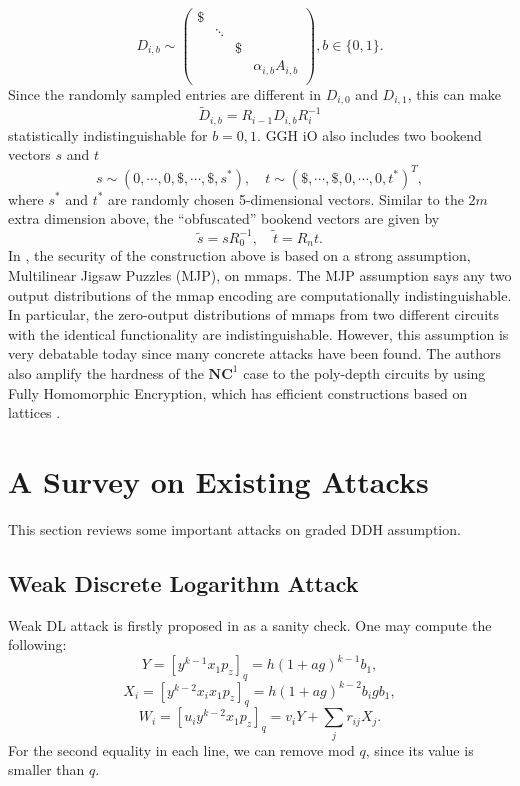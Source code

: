 \documentclass[10pt]{article}
\theoremstyle{plain}
\theoremstyle{definition}
\theoremstyle{remark}
\newcommand{\bits}{\{0,1\}}
\begin{document}
$$D_{i,b} \sim \begin{pmatrix}
\$ & & & \\
& \ddots & & \\
& & \$ & \\
& & & \alpha_{i,b} A_{i,b} \\
\end{pmatrix}, b \in \bits.$$ 
Since the randomly sampled entries are different in $D_{i,0}$ and $D_{i,1}$, this can make 
$$\tilde{D}_{i,b} = R_{i-1} D_{i,b} R_i^{-1}$$
statistically indistinguishable for $b = 0,1$. GGH iO also includes two bookend vectors $s$ and $t$
$$s \sim (0, \cdots, 0, \$, \cdots, \$, s^*), \quad t \sim (\$, \cdots, \$, 0, \cdots, 0, t^*)^T,$$
where $s^*$ and $t^*$ are randomly chosen 5-dimensional vectors. Similar to the $2m$ extra dimension above, the ``obfuscated'' bookend vectors are given by
$$\tilde{s} = sR_0^{-1}, \quad \tilde{t} = R_n t.$$
In \cite{GGH13b}, the security of the construction above is based on a strong assumption, Multilinear Jigsaw Puzzles (MJP), on mmaps. The MJP assumption says any two output distributions of the mmap encoding are computationally indistinguishable. In particular, the zero-output distributions of mmaps from two different circuits with the identical functionality are indistinguishable. However, this assumption is very debatable today since many concrete attacks have been found. The authors also amplify the hardness of the $\mathbf{NC}^1$ case to the poly-depth circuits by using Fully Homomorphic Encryption, which has efficient constructions based on lattices \cite{BV14, GSW13}.

\section{A Survey on Existing Attacks}
This section reviews some important attacks on graded DDH assumption.

\subsection{Weak Discrete Logarithm Attack}
Weak DL attack is firstly proposed in \cite{GGH13a} as a sanity check. 
One may compute the following:
$$Y = [y^{k-1}x_1p_z]_q = h(1+ag)^{k-1}b_1,$$
$$X_i = [y^{k-2}x_ix_1p_z]_q = h(1+ag)^{k-2}b_igb_1,$$
$$W_i = [u_iy^{k-2}x_1p_z]_q = v_iY + \sum_j r_{ij} X_j.$$
For the second equality in each line, we can remove mod $q$, since its value is smaller than $q$. 
\end{document}
